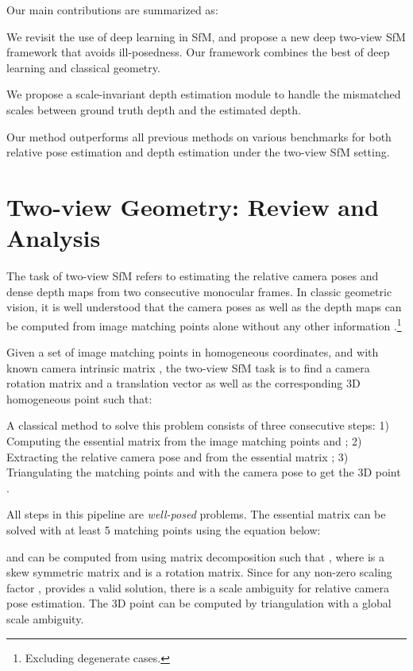 \documentclass[final]{cvpr}
\begin{document}
Our main contributions are summarized as:
\begin{compactenum}[1)]
    \item We revisit the use of deep learning in SfM, and propose a new deep two-view SfM framework that avoids ill-posedness. Our framework combines the best of deep learning and classical geometry.
    \item We propose a scale-invariant depth estimation module to handle the mismatched scales between ground truth depth and the estimated depth.
    \item Our method outperforms all previous methods on various benchmarks for both relative pose estimation and depth estimation under the two-view SfM setting.
\end{compactenum}

\section{Two-view Geometry: Review and Analysis}

The task of two-view SfM refers to estimating the relative camera poses and dense depth maps from two consecutive monocular frames. In classic geometric vision, it is well understood that the camera poses as well as the depth maps can be computed from image matching points alone without any other information \cite{longuet1981computer}.\footnote{Excluding degenerate cases.} 
 
Given a set of image matching points in homogeneous coordinates,  and  with known camera intrinsic matrix , the two-view SfM task is to find a camera rotation matrix  and a translation vector  as well as the corresponding 3D homogeneous point  such that:


A classical method to solve this problem consists of three consecutive steps: 1) Computing the essential matrix  from the image matching points  and ; 2) Extracting the relative camera pose  and  from the essential matrix ; 3) Triangulating the matching points  and  with the camera pose to get the 3D point .   

All steps in this pipeline are \emph{well-posed} problems. The essential matrix  can be solved with at least 5 matching points using the equation below:

 and  can be computed from  using matrix decomposition such that , where  is a skew symmetric matrix and  is a rotation matrix. Since for any non-zero scaling factor ,  provides a valid solution, there is a scale ambiguity for relative camera pose estimation. The 3D point  can be computed by triangulation with a global scale ambiguity.
\end{document}
